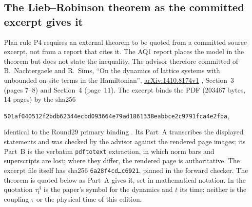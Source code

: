 \subsection{The Lieb--Robinson theorem as the committed excerpt gives it}
\label{sec:ba2-ns}
Plan rule P4 requires an external theorem to be quoted from a committed source
excerpt, not from a report that cites it. The AQ1 report places the model in
the theorem but does not state the inequality. The advisor therefore committed
of B.~Nachtergaele and R.~Sims, ``On the dynamics of lattice systems with
unbounded on-site terms in the Hamiltonian'',
\href{https://arxiv.org/abs/1410.8174v1}{arXiv:1410.8174v1} \cite{ns}, Section~3 (pages
7--8) and Section~4 (page~11). The excerpt binds the PDF (203467 bytes,
14 pages) by the sha256
\begin{center}\small
\texttt{501af040512f2bdb62344ecbd093664e79ad1861338eabbce2c9791fca4e2fba},
\end{center}
identical to the Round29 primary binding . Its Part~A transcribes the displayed statements and was
checked by the advisor against the rendered page images; its Part~B is the
verbatim \texttt{pdftotext} extraction, in which norm bars and superscripts
are lost; where they differ, the rendered page is authoritative. The excerpt
file itself has sha256 \texttt{6a28f4cd\ldots c6921}, pinned in the forward
checker. The theorem is quoted below as Part~A gives it, set in mathematical
notation. In the quotation $\tau^\Lambda_t$ is the paper's symbol for the
dynamics and $t$ its time; neither is the coupling $\tau$ or the physical time
of this edition.

